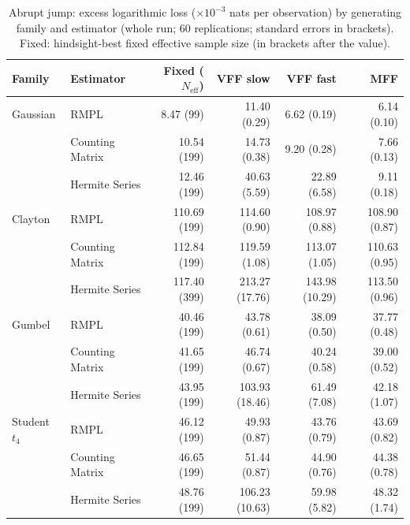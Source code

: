 \begin{table}[htbp]
\centering
\small
\caption{Abrupt jump: excess logarithmic loss ($\times10^{-3}$ nats per observation) by generating family and estimator (whole run; 60 replications; standard errors in brackets). Fixed: hindsight-best fixed effective sample size (in brackets after the value).}
\label{tab:app-strategy-excess-jump}
\begin{tabular}{llrrrr}
\toprule
Family & Estimator & Fixed ($N_{\mathrm{eff}}$) & VFF slow & VFF fast & MFF \\
\midrule
Gaussian & RMPL & 8.47 (99) & 11.40 (0.29) & 6.62 (0.19) & 6.14 (0.10) \\
 & Counting Matrix & 10.54 (199) & 14.73 (0.38) & 9.20 (0.28) & 7.66 (0.13) \\
 & Hermite Series & 12.46 (199) & 40.63 (5.59) & 22.89 (6.58) & 9.11 (0.18) \\
\addlinespace
Clayton & RMPL & 110.69 (199) & 114.60 (0.90) & 108.97 (0.88) & 108.90 (0.87) \\
 & Counting Matrix & 112.84 (199) & 119.59 (1.08) & 113.07 (1.05) & 110.63 (0.95) \\
 & Hermite Series & 117.40 (399) & 213.27 (17.76) & 143.98 (10.29) & 113.50 (0.96) \\
\addlinespace
Gumbel & RMPL & 40.46 (199) & 43.78 (0.61) & 38.09 (0.50) & 37.77 (0.48) \\
 & Counting Matrix & 41.65 (199) & 46.74 (0.67) & 40.24 (0.58) & 39.00 (0.52) \\
 & Hermite Series & 43.95 (199) & 103.93 (18.46) & 61.49 (7.08) & 42.18 (1.07) \\
\addlinespace
Student $t_4$ & RMPL & 46.12 (199) & 49.93 (0.87) & 43.76 (0.79) & 43.69 (0.82) \\
 & Counting Matrix & 46.65 (199) & 51.44 (0.87) & 44.90 (0.76) & 44.38 (0.78) \\
 & Hermite Series & 48.76 (199) & 106.23 (10.63) & 59.98 (5.82) & 48.32 (1.74) \\
\bottomrule
\end{tabular}
\end{table}

